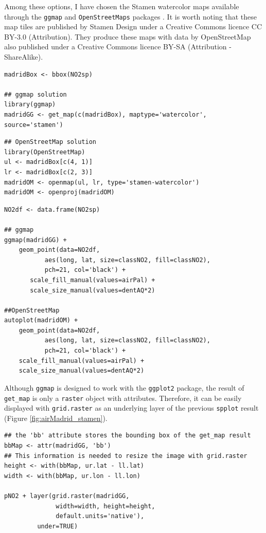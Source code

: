 Among these options, I have chosen the Stamen watercolor maps
available through the \texttt{ggmap} \cite{Kahle.Wickham2013} and
\texttt{OpenStreetMaps} packages \cite{Fellows.Stotz2013}. It is worth noting
that these map tiles are published by Stamen Design under a Creative
Commons licence CC BY-3.0 (Attribution). They produce these maps with
data by OpenStreetMap also published under a Creative Commons licence
BY-SA (Attribution - ShareAlike).


\lstset{language=R,numbers=none}
\begin{lstlisting}
madridBox <- bbox(NO2sp)

## ggmap solution
library(ggmap)
madridGG <- get_map(c(madridBox), maptype='watercolor', source='stamen')
\end{lstlisting}

\lstset{language=R,numbers=none}
\begin{lstlisting}
## OpenStreetMap solution
library(OpenStreetMap)
ul <- madridBox[c(4, 1)]
lr <- madridBox[c(2, 3)]
madridOM <- openmap(ul, lr, type='stamen-watercolor')
madridOM <- openproj(madridOM)
\end{lstlisting}

\lstset{language=R,numbers=none}
\begin{lstlisting}
NO2df <- data.frame(NO2sp)

## ggmap
ggmap(madridGG) +
    geom_point(data=NO2df,
	       aes(long, lat, size=classNO2, fill=classNO2),
	       pch=21, col='black') +
       scale_fill_manual(values=airPal) +
       scale_size_manual(values=dentAQ*2)

##OpenStreetMap
autoplot(madridOM) + 
    geom_point(data=NO2df,
	       aes(long, lat, size=classNO2, fill=classNO2),
	       pch=21, col='black') +
    scale_fill_manual(values=airPal) +
    scale_size_manual(values=dentAQ*2)
\end{lstlisting}

Although \texttt{ggmap} is designed to work with the \texttt{ggplot2} package, the
result of \texttt{get\_map} is only a \texttt{raster} object with
attributes. Therefore, it can be easily displayed with \texttt{grid.raster}
as an underlying layer of the previous \texttt{spplot} result (Figure
\ref{fig:airMadrid_stamen}).

\lstset{language=R,numbers=none}
\begin{lstlisting}
## the 'bb' attribute stores the bounding box of the get_map result
bbMap <- attr(madridGG, 'bb')
## This information is needed to resize the image with grid.raster
height <- with(bbMap, ur.lat - ll.lat)
width <- with(bbMap, ur.lon - ll.lon)

pNO2 + layer(grid.raster(madridGG,
			  width=width, height=height,
			  default.units='native'),
	     under=TRUE)
\end{lstlisting}

